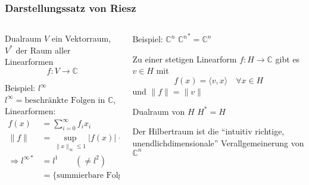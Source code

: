 %
%
%
\bgroup
\begin{frame}[t]
\setlength{\abovedisplayskip}{5pt}
\setlength{\belowdisplayskip}{5pt}
\frametitle{Darstellungssatz von Riesz}
\vspace{-20pt}
\begin{columns}[t,onlytextwidth]
\begin{column}{0.48\textwidth}
\begin{block}{Dualraum}
$V$ ein Vektorraum, $V^*$ der Raum aller Linearformen
\[
f\colon V\to \mathbb{C}
\]
\end{block}
\begin{block}{Beispiel: $l^\infty$}
$l^\infty=\text{beschränkte Folgen in $\mathbb{C}$}$,
Linearformen:
\begin{align*}
f(x)
&=
\sum_{i=0}^\infty f_ix_i
\\
\|f\|
&=
\sup_{\|x\|_{\infty}\le 1}
|f(x)|
=
\sum_{k\in\mathbb{N}} |f_k|
\\
\Rightarrow
l^{\infty*}
&=
l^1
\qquad(\ne l^2)
\\
&=\{\text{summierbare Folgen in $\mathbb{C}$}\}
\end{align*}

\end{block}
\end{column}
\begin{column}{0.48\textwidth}
\begin{block}{Beispiel: $\mathbb{C}^n$}
${\mathbb{C}^n}^* = \mathbb{C}^n$
\end{block}
\begin{theorem}[Riesz]
Zu einer stetigen Linearform $f\colon H\to\mathbb{C}$ gibt es $v\in H$ mit
\[
f(x) = \langle v,x\rangle
\quad\forall x\in H
\]
und $\|f\| = \|v\|$
\end{theorem}
\begin{block}{Dualraum von $H$}
$H^*=H$
\end{block}
Der Hilbertraum ist die ``intuitiv richtige, unendlichdimensionale''
Verallgemeinerung von $\mathbb{C}^n$
\end{column}
\end{columns}
\end{frame}
\egroup

